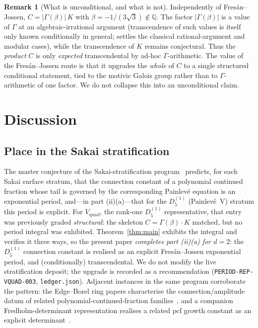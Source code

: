 \documentclass[11pt,reqno]{amsart}
\renewcommand{\_}{\vquadorigunderscore\allowbreak}
\theoremstyle{plain}
\theoremstyle{definition}
\newtheorem{remark}[theorem]{Remark}
\newcommand{\Vquad}{V_{\mathrm{quad}}}
\providecommand{\C}{}\renewcommand{\C}{C}
\begin{document}
\begin{remark}[What is unconditional, and what is not]\label{rmk:uncond}
Independently of Fres\'an--Jossen, $\C=\lvert\Gamma(\beta)\rvert\,K$ with
$\beta=-1/(3\sqrt3)\notin\mathbb{Q}$. The factor $\lvert\Gamma(\beta)\rvert$ is a value of
$\Gamma$ at an algebraic-irrational argument (transcendence of such values is itself only known
conditionally in general; \cite{Nesterenko} settles the classical rational-argument and modular
cases), while the transcendence of $K$ remains conjectural. Thus the \emph{product} $\C$ is only
\emph{expected} transcendental by ad-hoc $\Gamma$-arithmetic. The value of the Fres\'an--Jossen
route is that it upgrades the \emph{whole} of $\C$ to a single structured conditional statement,
tied to the motivic Galois group rather than to $\Gamma$-arithmetic of one factor. We do not
collapse this into an unconditional claim.
\end{remark}

\section{Discussion}\label{sec:disc}

\subsection{Place in the Sakai stratification}
The master conjecture of the Sakai-stratification program~\cite{Sakai} predicts, for each Sakai
surface stratum, that the connection constant of a polynomial continued fraction whose tail is
governed by the corresponding Painlev\'e equation is an exponential period, and---in part
(ii)(a)---that for the $D_5^{(1)}$ (Painlev\'e~V) stratum this period is explicit. For $\Vquad$,
the rank-one $D_5^{(1)}$ representative, that entry was previously graded \emph{structural}: the
skeleton $\C=\Gamma(\beta)\cdot K$ matched, but no period integral was exhibited.
Theorem~\ref{thm:main} exhibits the integral and verifies it three ways, so the present paper
\emph{completes part (ii)(a) for $d=2$}: the $D_5^{(1)}$ connection constant is realised as an
explicit Fres\'an--Jossen exponential period, and (conditionally) transcendental. We do not modify
the live stratification deposit; the upgrade is recorded as a recommendation
(\texttt{PERIOD-REP-VQUAD-003}, \texttt{ledger.json}). Adjacent instances in the same program
corroborate the pattern: the Edge--Borel ring papers characterise the connection/amplitude datum of
related polynomial-continued-fraction families~\cite{EBRIb,EBRII}, and a companion
Fredholm-determinant representation realises a related $\mathrm{pcf}$ growth constant as an explicit
determinant~\cite{FredDelta}.
\end{document}
